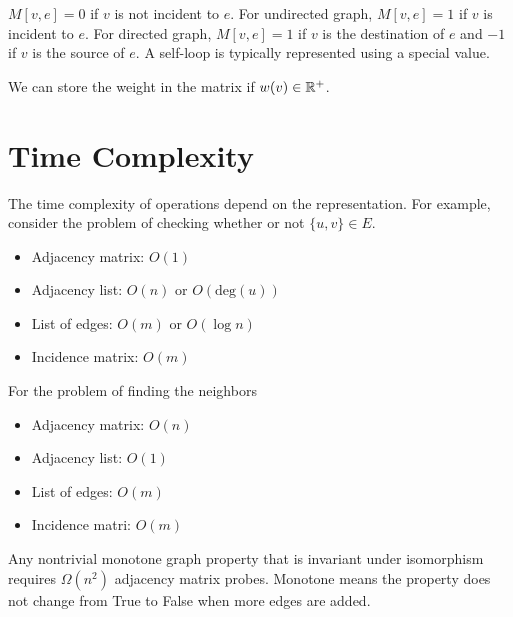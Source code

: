 $M[v,e]=0$ if $v$ is not incident to $e$. For undirected graph, $M[v,e]=1$ if $v$ is incident to $e$. For directed graph, $M[v,e]=1$ if $v$ is the destination of $e$ and $-1$ if $v$ is the source of $e$. A self-loop is typically represented using a special value.

We can store the weight in the matrix if $w(v) \in \mathbb{R}^+$. 

\section{Time Complexity}

The time complexity of operations depend on the representation. For example, consider the problem of checking whether or not $\{u,v\} \in E$.

\begin{itemize}
    \item Adjacency matrix: $O(1)$
    \item Adjacency list: $O(n)$ or $O(\mathrm{deg}(u))$
    \item List of edges: $O(m)$ or $O(\log n)$
    \item Incidence matrix: $O(m)$  
\end{itemize}

For the problem of finding the neighbors

\begin{itemize}
    \item Adjacency matrix: $O(n)$ 
    \item Adjacency list: $O(1)$ 
    \item List of edges: $O(m)$ 
    \item Incidence matri: $O(m)$ 
\end{itemize}


\begin{theorem}
    Any nontrivial monotone graph property that is invariant under isomorphism requires $\Omega(n^2)$ adjacency matrix probes. Monotone means the property does not change from True to False when more edges are added.
\end{theorem}